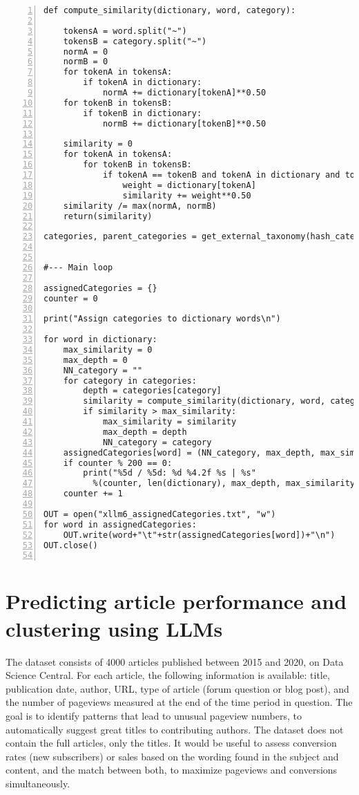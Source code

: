 \documentclass[oneside,10pt]{book}
\begin{document}
\begin{lstlisting}[numbers=left]
def compute_similarity(dictionary, word, category):

    tokensA = word.split("~")
    tokensB = category.split("~")
    normA = 0
    normB = 0
    for tokenA in tokensA:
        if tokenA in dictionary:
            normA += dictionary[tokenA]**0.50
    for tokenB in tokensB:
        if tokenB in dictionary:
            normB += dictionary[tokenB]**0.50

    similarity = 0
    for tokenA in tokensA:
        for tokenB in tokensB:
            if tokenA == tokenB and tokenA in dictionary and tokenB in dictionary:
                weight = dictionary[tokenA]
                similarity += weight**0.50
    similarity /= max(normA, normB) 
    return(similarity)

categories, parent_categories = get_external_taxonomy(hash_category)


#--- Main loop

assignedCategories = {}
counter = 0

print("Assign categories to dictionary words\n")

for word in dictionary:
    max_similarity = 0
    max_depth = 0
    NN_category = ""
    for category in categories: 
        depth = categories[category]
        similarity = compute_similarity(dictionary, word, category)
        if similarity > max_similarity:
            max_similarity = similarity
            max_depth = depth
            NN_category = category
    assignedCategories[word] = (NN_category, max_depth, max_similarity)
    if counter % 200 == 0:
        print("%5d / %5d: %d %4.2f %s | %s" 
          %(counter, len(dictionary), max_depth, max_similarity, word, NN_category)) 
    counter += 1

OUT = open("xllm6_assignedCategories.txt", "w")
for word in assignedCategories:
    OUT.write(word+"\t"+str(assignedCategories[word])+"\n")
OUT.close()


\end{lstlisting}

\section{Predicting article performance and clustering using LLMs}\label{predxllm}

The dataset consists of 4000 articles published between 2015 and 2020, on Data Science Central. For each article, the following information is available: 
title, publication date, author, URL, type of article (forum question or blog post), and the number of pageviews measured at the end of the time period in question. The goal
 is to identify patterns that lead to unusual pageview numbers, to automatically suggest great titles to contributing authors. The dataset does not contain the full 
articles, only the titles. It would be useful to assess conversion rates (new subscribers) or sales based on the wording found in the subject and content, and the match between both, to maximize pageviews and conversions simultaneously. 
\end{document}
